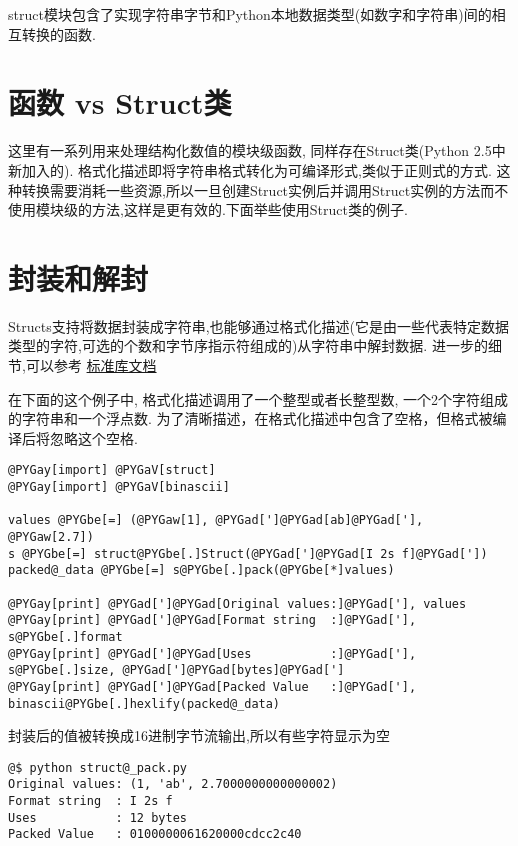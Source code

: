 \documentclass[a4paper,10pt,english]{manual}
\begin{document}
struct模块包含了实现字符串字节和Python本地数据类型(如数字和字符串)间的相互转换的函数.


\section{函数 vs Struct类}

这里有一系列用来处理结构化数值的模块级函数, 同样存在Struct类(Python 2.5中新加入的). 格式化描述即将字符串格式转化为可编译形式,类似于正则式的方式. 这种转换需要消耗一些资源,所以一旦创建Struct实例后并调用Struct实例的方法而不使用模块级的方法,这样是更有效的.下面举些使用Struct类的例子.


\section{封装和解封}

Structs支持将数据封装成字符串,也能够通过格式化描述(它是由一些代表特定数据类型的字符,可选的个数和字节序指示符组成的)从字符串中解封数据. 进一步的细节,可以参考 \href{http://docs.python.org/library/struct.html}{标准库文档}

在下面的这个例子中, 格式化描述调用了一个整型或者长整型数, 一个2个字符组成的字符串和一个浮点数. 为了清晰描述，在格式化描述中包含了空格，但格式被编译后将忽略这个空格.

\begin{Verbatim}[commandchars=@\[\]]
@PYGay[import] @PYGaV[struct]
@PYGay[import] @PYGaV[binascii]

values @PYGbe[=] (@PYGaw[1], @PYGad[']@PYGad[ab]@PYGad['], @PYGaw[2.7])
s @PYGbe[=] struct@PYGbe[.]Struct(@PYGad[']@PYGad[I 2s f]@PYGad['])
packed@_data @PYGbe[=] s@PYGbe[.]pack(@PYGbe[*]values)

@PYGay[print] @PYGad[']@PYGad[Original values:]@PYGad['], values
@PYGay[print] @PYGad[']@PYGad[Format string  :]@PYGad['], s@PYGbe[.]format
@PYGay[print] @PYGad[']@PYGad[Uses           :]@PYGad['], s@PYGbe[.]size, @PYGad[']@PYGad[bytes]@PYGad[']
@PYGay[print] @PYGad[']@PYGad[Packed Value   :]@PYGad['], binascii@PYGbe[.]hexlify(packed@_data)
\end{Verbatim}

封装后的值被转换成16进制字节流输出,所以有些字符显示为空

\begin{Verbatim}[commandchars=@\[\]]
@$ python struct@_pack.py
Original values: (1, 'ab', 2.7000000000000002)
Format string  : I 2s f
Uses           : 12 bytes
Packed Value   : 0100000061620000cdcc2c40
\end{Verbatim}
\end{document}
